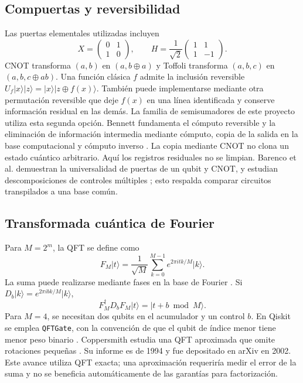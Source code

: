 \documentclass[10pt,a4paper,twocolumn]{article}
\newcommand{\ket}[1]{\lvert #1\rangle}
\begin{document}
\subsection{Compuertas y reversibilidad}
Las puertas elementales utilizadas incluyen
\begin{equation}
X=\begin{pmatrix}0&1\\1&0\end{pmatrix},\qquad
H=\frac{1}{\sqrt2}\begin{pmatrix}1&1\\1&-1\end{pmatrix}.
\end{equation}
CNOT transforma $(a,b)$ en $(a,b\oplus a)$ y Toffoli transforma
$(a,b,c)$ en $(a,b,c\oplus ab)$. Una función clásica $f$ admite la inclusión
reversible $U_f\ket{x}\ket{z}=\ket{x}\ket{z\oplus f(x)}$.
También puede implementarse mediante otra permutación reversible que deje
$f(x)$ en una línea identificada y conserve información residual en las demás.
La familia de semisumadores de este proyecto utiliza esta segunda opción.
Bennett fundamenta el cómputo reversible y la eliminación de información
intermedia mediante cómputo, copia de la salida en la base computacional y
cómputo inverso \cite{bennett1973}. La copia mediante CNOT no clona un estado
cuántico arbitrario. Aquí los registros residuales no se limpian.
Barenco et al. demuestran la universalidad de puertas de un qubit y CNOT,
y estudian descomposiciones de controles múltiples \cite{barenco1995}; esto
respalda comparar circuitos transpilados a una base común.

\subsection{Transformada cuántica de Fourier}
Para $M=2^m$, la QFT se define como
\begin{equation}
F_M\ket{t}=\frac{1}{\sqrt M}\sum_{k=0}^{M-1}
e^{2\pi i tk/M}\ket{k}.
\end{equation}
La suma puede realizarse mediante fases en la base de Fourier
\cite{draper2000}. Si $D_b\ket{k}=e^{2\pi i bk/M}\ket{k}$,
\begin{equation}
F_M^\dagger D_bF_M\ket{t}=\ket{t+b\bmod M}.
\label{eq:add}
\end{equation}
Para $M=4$, se necesitan dos qubits en el acumulador y un control $b$.
En Qiskit se emplea \texttt{QFTGate}, con la convención de que el qubit
de índice menor tiene menor peso binario \cite{qftdocs}.
Coppersmith estudia una QFT aproximada que omite rotaciones pequeñas
\cite{coppersmith2002}. Su informe es de 1994 y fue depositado en arXiv en
2002. Este avance utiliza QFT exacta; una aproximación requeriría medir el
error de la suma y no se beneficia automáticamente de las garantías para
factorización.
\end{document}
